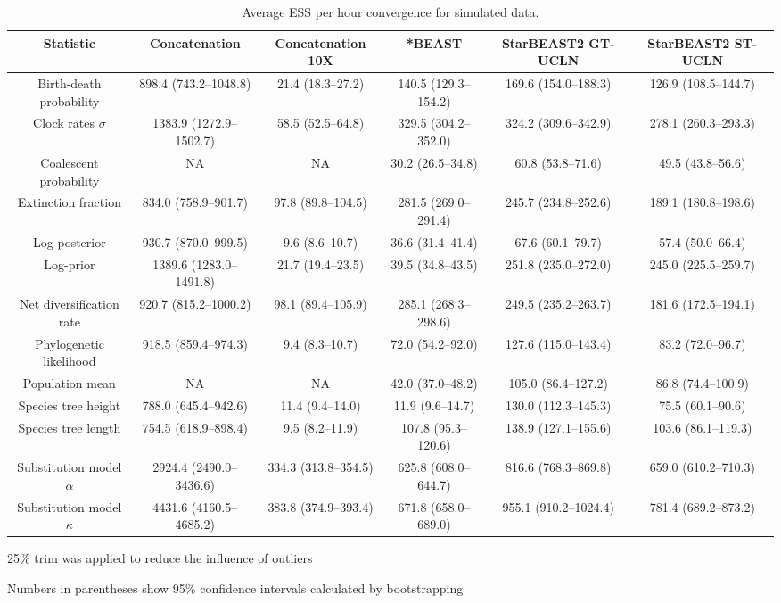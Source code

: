 \documentclass[12pt]{article}
\begin{document}
\begin{landscape}
\clearpage

\begin{table}[htb!]
\centering
\caption{Average ESS per hour convergence for simulated data.}
\label{tab:simulatedPerHour}
\begin{threeparttable}
\begin{adjustbox}{center}
\renewcommand{\arraystretch}{1.2}
\footnotesize
\begin{tabular}{|c|c|c|c|c|c|}
\multicolumn{1}{c}{Statistic} & \multicolumn{1}{c}{Concatenation} & \multicolumn{1}{c}{Concatenation 10X} & \multicolumn{1}{c}{*BEAST} & \multicolumn{1}{c}{StarBEAST2 GT-UCLN} & \multicolumn{1}{c}{StarBEAST2 ST-UCLN}\tabularnewline
\hline
Birth-death probability & 898.4 (743.2--1048.8) & 21.4 (18.3--27.2) & 140.5 (129.3--154.2) & 169.6 (154.0--188.3) & 126.9 (108.5--144.7)\tabularnewline
\hline
Clock rates $\sigma$ & 1383.9 (1272.9--1502.7) & 58.5 (52.5--64.8) & 329.5 (304.2--352.0) & 324.2 (309.6--342.9) & 278.1 (260.3--293.3)\tabularnewline
\hline
Coalescent probability & NA & NA & 30.2 (26.5--34.8) & 60.8 (53.8--71.6) & 49.5 (43.8--56.6)\tabularnewline
\hline
Extinction fraction & 834.0 (758.9--901.7) & 97.8 (89.8--104.5) & 281.5 (269.0--291.4) & 245.7 (234.8--252.6) & 189.1 (180.8--198.6)\tabularnewline
\hline
Log-posterior & 930.7 (870.0--999.5) & 9.6 (8.6--10.7) & 36.6 (31.4--41.4) & 67.6 (60.1--79.7) & 57.4 (50.0--66.4)\tabularnewline
\hline
Log-prior & 1389.6 (1283.0--1491.8) & 21.7 (19.4--23.5) & 39.5 (34.8--43.5) & 251.8 (235.0--272.0) & 245.0 (225.5--259.7)\tabularnewline
\hline
Net diversification rate & 920.7 (815.2--1000.2) & 98.1 (89.4--105.9) & 285.1 (268.3--298.6) & 249.5 (235.2--263.7) & 181.6 (172.5--194.1)\tabularnewline
\hline
Phylogenetic likelihood & 918.5 (859.4--974.3) & 9.4 (8.3--10.7) & 72.0 (54.2--92.0) & 127.6 (115.0--143.4) & 83.2 (72.0--96.7)\tabularnewline
\hline
Population mean & NA & NA & 42.0 (37.0--48.2) & 105.0 (86.4--127.2) & 86.8 (74.4--100.9)\tabularnewline
\hline
Species tree height & 788.0 (645.4--942.6) & 11.4 (9.4--14.0) & 11.9 (9.6--14.7) & 130.0 (112.3--145.3) & 75.5 (60.1--90.6)\tabularnewline
\hline
Species tree length & 754.5 (618.9--898.4) & 9.5 (8.2--11.9) & 107.8 (95.3--120.6) & 138.9 (127.1--155.6) & 103.6 (86.1--119.3)\tabularnewline
\hline
Substitution model $\alpha$ & 2924.4 (2490.0--3436.6) & 334.3 (313.8--354.5) & 625.8 (608.0--644.7) & 816.6 (768.3--869.8) & 659.0 (610.2--710.3)\tabularnewline
\hline
Substitution model $\kappa$ & 4431.6 (4160.5--4685.2) & 383.8 (374.9--393.4) & 671.8 (658.0--689.0) & 955.1 (910.2--1024.4) & 781.4 (689.2--873.2)\tabularnewline
\hline
\end{tabular}
\end{adjustbox}
\begin{tablenotes}
\footnotesize
\item 25\% trim was applied to reduce the influence of outliers
\item Numbers in parentheses show 95\% confidence intervals calculated by bootstrapping
\end{tablenotes}
\end{threeparttable}
\end{table}


\end{landscape}
\end{document}

